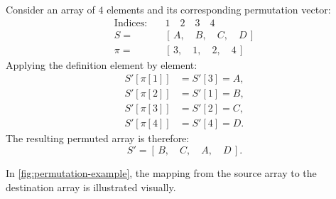 \begin{example}
\label{ex:permutation-def}
Consider an array of $4$ elements and its corresponding permutation vector:
\begin{align*}
  \text{Indices:} \quad & 1 \quad 2 \quad 3 \quad 4 \\
  S = \quad & [\, A, \quad B, \quad C, \quad D \,] \\
  \pi = \quad & [\, 3, \quad 1, \quad 2, \quad 4 \,]
\end{align*}
Applying the definition element by element:
\begin{align*}
  S'[\pi[1]] &= S'[3] = A, \\
  S'[\pi[2]] &= S'[1] = B, \\
  S'[\pi[3]] &= S'[2] = C, \\
  S'[\pi[4]] &= S'[4] = D.
\end{align*}
The resulting permuted array is therefore:
\[
  S' = [\, B, \quad C, \quad A, \quad D \,].
\]
\end{example}

In \autoref{fig:permutation-example}, the mapping from the source array to the destination array is illustrated visually.

